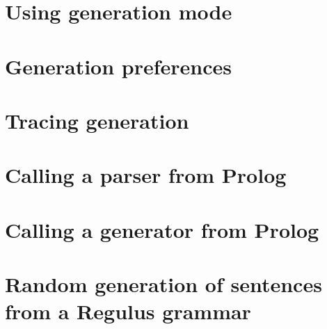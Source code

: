 \section{Using generation mode}
\label{Section:GenerationMode}

\section{Generation preferences}
\label{Section:GenerationPreferences}

\section{Tracing generation}
\label{Section:GenerationTrace}

\section{Calling a parser from Prolog}
\label{Section:CallingParser}

\section{Calling a generator from Prolog}
\label{Section:CallingGenerator}

\section{Random generation of sentences from a Regulus grammar}
\label{Section:RandomGenerationRegulus}
